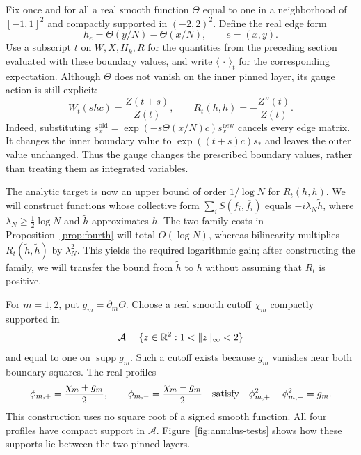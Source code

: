 Fix once and for all a real smooth function $\Theta$ equal to one in a
neighborhood of $[-1,1]^2$ and compactly supported in $(-2,2)^2$.  Define
the real edge form
\begin{equation}\label{eq:annulus-h}
 h_e=\Theta(y/N)-\Theta(x/N),\qquad e=(x,y).
\end{equation}
Use a subscript $t$ on $W,X,H_k,R$ for the quantities from the preceding
section evaluated with these boundary values, and write
$\langle\,\cdot\,\rangle_t$ for the corresponding expectation.  Although
$\Theta$ does not vanish on the inner pinned layer, its gauge action is
still explicit:
\begin{equation}\label{eq:annulus-boundary-gauge}
 W_t(shc)=\frac{Z(t+s)}{Z(t)},
 \qquad
 R_t(h,h)=-\frac{Z''(t)}{Z(t)}.
\end{equation}
Indeed, substituting
$s_x^{\mathrm{old}}=\exp(-s\Theta(x/N)c)s_x^{\mathrm{new}}$
cancels every edge matrix.  It changes the inner boundary value to
$\exp((t+s)c)s_*$ and leaves the outer value unchanged.  Thus the gauge
changes the prescribed boundary values, rather than treating them as
integrated variables.

The analytic target is now an upper bound of order $1/\log N$ for
$R_t(h,h)$.  We will construct functions whose collective form
$\sum_i S(f_i,\overline{f_i})$ equals $-i\lambda_N\widetilde h$,
where $\lambda_N\geq\tfrac12\log N$ and $\widetilde h$ approximates $h$.
The two family costs in Proposition~\ref{prop:fourth} will total
$O(\log N)$, whereas bilinearity multiplies
$R_t(\widetilde h,\widetilde h)$ by $\lambda_N^2$.
This yields the required logarithmic gain; after constructing the family,
we will transfer the bound from $\widetilde h$ to $h$ without assuming
that $R_t$ is positive.

For $m=1,2$, put $g_m=\partial_m\Theta$.  Choose a real smooth cutoff
$\chi_m$ compactly supported in
\[
 \mathcal A=\{z\in\mathbb R^2:1<\|z\|_\infty<2\}
\]
and equal to one on $\operatorname{supp}g_m$.  Such a cutoff exists
because $g_m$ vanishes near both boundary squares.  The real profiles
\begin{equation}\label{eq:annulus-profiles}
 \phi_{m,+}=\frac{\chi_m+g_m}{2},\qquad
 \phi_{m,-}=\frac{\chi_m-g_m}{2}
 \quad\hbox{satisfy}\quad
 \phi_{m,+}^2-\phi_{m,-}^2=g_m.
\end{equation}
This construction uses no square root of a signed smooth function.
All four profiles have compact support in $\mathcal A$.
Figure~\ref{fig:annulus-tests} shows how these supports lie between
the two pinned layers.

